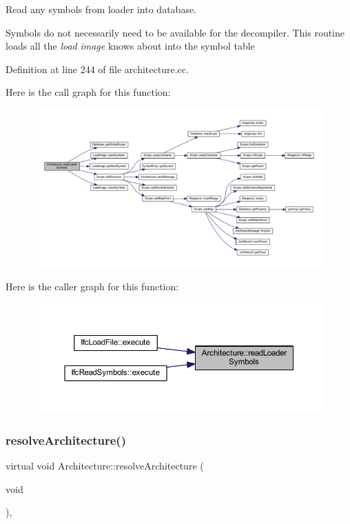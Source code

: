 Read any symbols from loader into database. 

Symbols do not necessarily need to be available for the decompiler. This routine loads all the {\itshape load} {\itshape image} knows about into the symbol table 

Definition at line 244 of file architecture.\+cc.

Here is the call graph for this function\+:
\nopagebreak
\begin{figure}[H]
\begin{center}
\leavevmode
\includegraphics[width=350pt]{class_architecture_ac6c95a933f8a42d6d1d46d8663a793a2_cgraph}
\end{center}
\end{figure}
Here is the caller graph for this function\+:
\nopagebreak
\begin{figure}[H]
\begin{center}
\leavevmode
\includegraphics[width=350pt]{class_architecture_ac6c95a933f8a42d6d1d46d8663a793a2_icgraph}
\end{center}
\end{figure}
\mbox{\label{class_architecture_aea7d061dab582340c8e9bb3323abdf4a}} 
\subsubsection{\texorpdfstring{resolveArchitecture()}{resolveArchitecture()}}
{\footnotesize\ttfamily virtual void Architecture\+::resolve\+Architecture (\begin{DoxyParamCaption}\item[{void}]{ }\end{DoxyParamCaption})\hspace{0.3cm}{\ttfamily [protected]}, {}}



